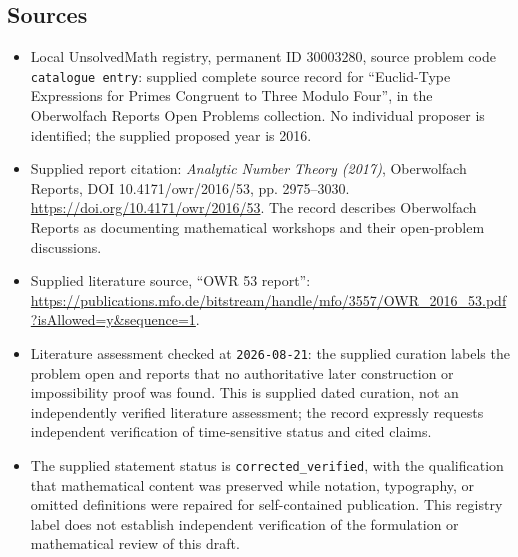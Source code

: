 \documentclass[11pt]{article}
\begin{document}
\subsection{Sources}
\begin{itemize}
\item Local UnsolvedMath registry, permanent ID \(30003280\), source problem code \texttt{catalogue entry}: supplied complete source record for ``Euclid-Type Expressions for Primes Congruent to Three Modulo Four'', in the Oberwolfach Reports Open Problems collection. No individual proposer is identified; the supplied proposed year is 2016.
\item Supplied report citation: \emph{Analytic Number Theory (2017)}, Oberwolfach Reports, DOI 10.4171/owr/2016/53, pp. 2975--3030. \url{https://doi.org/10.4171/owr/2016/53}. The record describes Oberwolfach Reports as documenting mathematical workshops and their open-problem discussions.
\item Supplied literature source, ``OWR 53 report'': \url{https://publications.mfo.de/bitstream/handle/mfo/3557/OWR_2016_53.pdf?isAllowed=y&sequence=1}.
\item Literature assessment checked at \texttt{2026-08-21}: the supplied curation labels the problem open and reports that no authoritative later construction or impossibility proof was found. This is supplied dated curation, not an independently verified literature assessment; the record expressly requests independent verification of time-sensitive status and cited claims.
\item The supplied statement status is \texttt{corrected\_verified}, with the qualification that mathematical content was preserved while notation, typography, or omitted definitions were repaired for self-contained publication. This registry label does not establish independent verification of the formulation or mathematical review of this draft.
\end{itemize}
\end{document}
